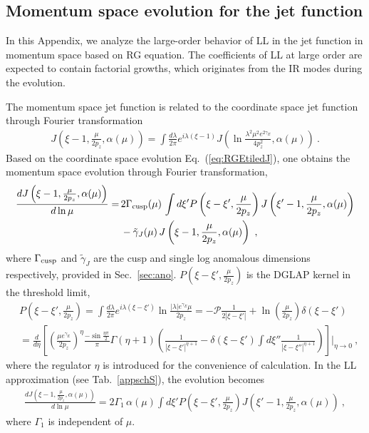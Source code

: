\documentclass[a4paper,11pt]{article}
\begin{document}
\subsection{Momentum space evolution for the jet function}\label{subsubsec:Momevomomscale}
In this Appendix, we analyze the large-order behavior of LL in the jet function in momentum space based on RG equation. The coefficients of LL at large order are expected to contain factorial growths, which originates from the IR modes during the evolution. 

The momentum space jet function is related to the coordinate space jet function through Fourier transformation
\begin{align}
J\left(\xi-1, \frac{\mu}{2 p_z}, \alpha(\mu)\right) = \int \frac{d\lambda}{2\pi} e^{i \lambda (\xi-1)} J\left(\ln\frac{\lambda^2 \mu^2 e^{2\gamma_E}}{4 p_z^2},\alpha(\mu)\right) \ .
\end{align}
Based on the coordinate space evolution Eq.~(\ref{eq:RGEtiledJ}), one obtains the momentum space evolution through Fourier transformation,
\begin{align}
\frac{d J\left(\xi-1, \frac{\mu}{2 p_z}, \alpha(\mu)\right)}{d \ln \mu} =& \, 2 \Gamma_{\rm cusp}(\mu) \, \int d\xi' P\left(\xi-\xi',\frac{\mu}{2 p_z}\right) J\left(\xi'-1, \frac{\mu}{2 p_z}, \alpha(\mu)\right) \nonumber\\
&\, - \tilde \gamma_{J}(\mu) \, J\left(\xi-1, \frac{\mu}{2 p_z}, \alpha(\mu)\right) \ ,
\end{align}
where $\Gamma_{\rm cusp}$ and $\tilde \gamma_J$ are the cusp and single log anomalous dimensions respectively, provided in Sec.~\ref{sec:ano}. $P\left(\xi-\xi',\frac{\mu}{2 p_z}\right)$ is the DGLAP kernel in the threshold limit,
\begin{align}
&P\left(\xi-\xi',\frac{\mu}{2 p_z}\right) = \int \frac{d \lambda}{2\pi} e^{i \lambda (\xi-\xi')} \ln \frac{|\lambda|e^{\gamma_{E}}\mu}{2p_z} = -\mathcal{P} \frac{1}{2|\xi-\xi'|} + \ln\left(\frac{\mu}{2p_z}\right) \delta(\xi-\xi') \nonumber\\
&= \frac{d}{d \eta} \left[\left(\frac{\mu e^{\gamma_E}}{2p_z}\right)^{\eta} \frac{- \sin \frac{\eta \pi}{2}}{\pi} \Gamma(\eta+1) \left( \frac{1}{|\xi-\xi'|^{\eta+1}} - \delta(\xi-\xi') \int d\xi'' \frac{1}{|\xi-\xi''|^{\eta+1}} \right)  \right] \Bigg|_{\eta \rightarrow 0} \ ,
\end{align}
where the regulator $\eta$ is introduced for the convenience of calculation. 
In the LL approximation (see Tab.~\ref{appschS}), the evolution becomes
\begin{align}\label{eq:RGmom}
\frac{d J\left(\xi-1, \frac{\mu}{2 p_z}, \alpha(\mu)\right)}{d \ln \mu} = 2 \Gamma_{1} \, \alpha(\mu) \int d\xi' P\left(\xi-\xi',\frac{\mu}{2 p_z}\right) J\left(\xi'-1, \frac{\mu}{2 p_z}, \alpha(\mu)\right) \ ,
\end{align}
where $\Gamma_{1}$ is independent of $\mu$.
\end{document}
